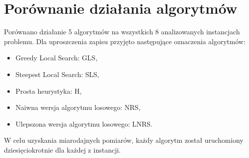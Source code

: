 \documentclass{article}
\begin{document}
\section{Porównanie działania algorytmów}
Porównano działanie 5 algorytmów na wszystkich 8 analizowanych instancjach problemu. Dla uproszczenia zapisu przyjęto następujące oznaczenia algorytmów:
\begin{itemize}
    \item Greedy Local Search: GLS,
    \item Steepest Local Search: SLS,
    \item Prosta heurystyka: H,
    \item Naiwna wersja algorytmu losowego: NRS,
    \item Ulepszona wersja algorytmu losowego: LNRS.
\end{itemize}
W celu uzyskania miarodajnych pomiarów, każdy algorytm został uruchomiony dziesięciokrotnie dla każdej z instancji. 
\end{document}
